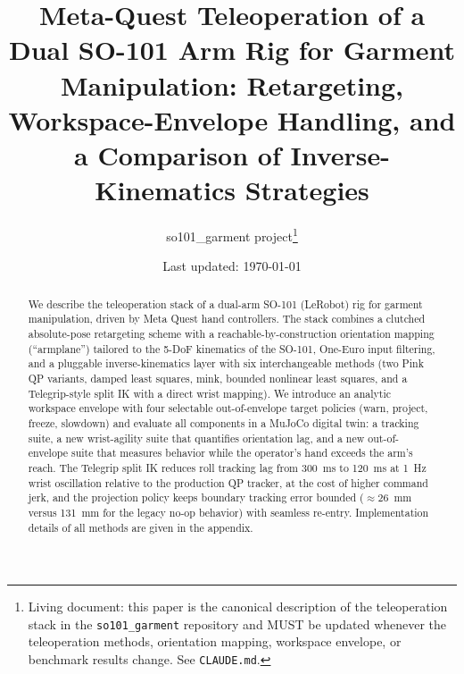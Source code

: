 \documentclass[10pt]{article}
\title{Meta-Quest Teleoperation of a Dual SO-101 Arm Rig for Garment
Manipulation: Retargeting, Workspace-Envelope Handling, and a Comparison of
Inverse-Kinematics Strategies}
\author{so101\_garment project\thanks{Living document: this paper is the
canonical description of the teleoperation stack in the
\texttt{so101\_garment} repository and MUST be updated whenever the
teleoperation methods, orientation mapping, workspace envelope, or benchmark
results change. See \texttt{CLAUDE.md}.}}
\date{Last updated: \today}
\begin{document}
\maketitle

\begin{abstract}
We describe the teleoperation stack of a dual-arm SO-101 (LeRobot) rig for
garment manipulation, driven by Meta Quest hand controllers. The stack
combines a clutched absolute-pose retargeting scheme with a
reachable-by-construction orientation mapping (``armplane'') tailored to the
5-DoF kinematics of the SO-101, One-Euro input filtering, and a pluggable
inverse-kinematics layer with six interchangeable methods (two Pink QP
variants, damped least squares, mink, bounded nonlinear least squares, and a
Telegrip-style split IK with a direct wrist mapping). We introduce an
analytic workspace envelope with four selectable out-of-envelope target
policies (warn, project, freeze, slowdown) and evaluate all components in a
MuJoCo digital twin: a tracking suite, a new wrist-agility suite that
quantifies orientation lag, and a new out-of-envelope suite that measures
behavior while the operator's hand exceeds the arm's reach. The Telegrip
split IK reduces roll tracking lag from \SI{300}{ms} to \SI{120}{ms} at
\SI{1}{Hz} wrist oscillation relative to the production QP tracker, at the
cost of higher command jerk, and the projection policy keeps boundary
tracking error bounded (\(\approx\)\SI{26}{mm} versus \SI{131}{mm} for the
legacy no-op behavior) with seamless re-entry. Implementation details of all
methods are given in the appendix.
\end{abstract}











\appendix

\end{document}
